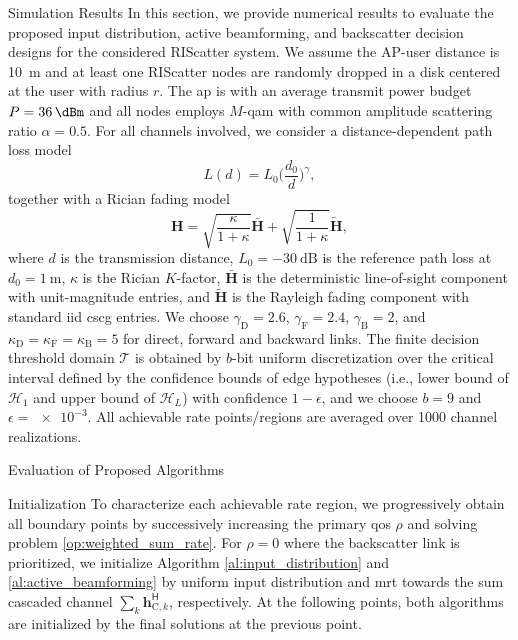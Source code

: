 \documentclass[journal,12pt,onecolumn,draftclsnofoot]{IEEEtran}
\theoremstyle{remark}
\begin{document}
\begin{section}{Simulation Results}
	In this section, we provide numerical results to evaluate the proposed input distribution, active beamforming, and backscatter decision designs for the considered RIScatter system.
	We assume the AP-user distance is \qty{10}{\meter} and at least one RIScatter nodes are randomly dropped in a disk centered at the user with radius $r$.
	The \gls{ap} is with an average transmit power budget $P=\qty{36}{\dBm}$ and all nodes employs $M$-\gls{qam} with common amplitude scattering ratio $\alpha=0.5$.
	For all channels involved, we consider a distance-dependent path loss model
	\begin{equation}
		L(d) = L_0 \biggl(\frac{d_0}{d}\biggr)^\gamma,
	\end{equation}
	together with a Rician fading model
	\begin{equation}
		\boldsymbol{H} = \sqrt{\frac{\kappa}{1+\kappa}} \bar{\boldsymbol{H}} + \sqrt{\frac{1}{1+\kappa}} \tilde{\boldsymbol{H}},
	\end{equation}
	where $d$ is the transmission distance, $L_0=-\qty{30}{\dB}$ is the reference path loss at $d_0=\qty{1}{\meter}$, $\kappa$ is the Rician $K$-factor, $\bar{\boldsymbol{H}}$ is the deterministic line-of-sight component with unit-magnitude entries, and $\tilde{\boldsymbol{H}}$ is the Rayleigh fading component with standard \gls{iid} \gls{cscg} entries.
	We choose $\gamma_{\text{D}}=2.6$, $\gamma_{\text{F}}=2.4$, $\gamma_{\text{B}}=2$, and $\kappa_{\text{D}}=\kappa_{\text{F}}=\kappa_{\text{B}}=5$ for direct, forward and backward links.
	The finite decision threshold domain $\mathcal{T}$ is obtained by $b$-bit uniform discretization over the critical interval defined by the confidence bounds of edge hypotheses (i.e., lower bound of $\mathcal{H}_1$ and upper bound of $\mathcal{H}_L$) with confidence $1-\epsilon$, and we choose $b=9$ and $\epsilon=\num{e-3}$.
	All achievable rate points/regions are averaged over \num{1000} channel realizations.

	\begin{subsection}{Evaluation of Proposed Algorithms}
		\begin{subsubsection}{Initialization}
			To characterize each achievable rate region, we progressively obtain all boundary points by successively increasing the primary \gls{qos} $\rho$ and solving problem \eqref{op:weighted_sum_rate}.
			For $\rho=0$ where the backscatter link is prioritized, we initialize Algorithm \ref{al:input_distribution} and \ref{al:active_beamforming} by uniform input distribution and \gls{mrt} towards the sum cascaded channel $\sum_{k} \boldsymbol{h}_{\text{C},k}^\mathsf{H}$, respectively.
			At the following points, both algorithms are initialized by the final solutions at the previous point.
		\end{subsubsection}


\end{subsection}
\end{section}
\end{document}
